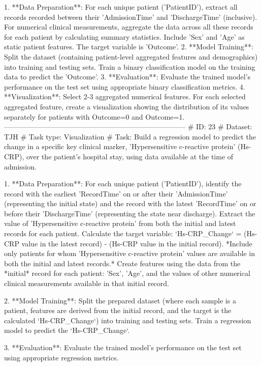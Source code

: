 \begin{tcolorbox}[colback=cadmiumgreen!5!white,colframe=forestgreen!75!white,breakable,title=\textit{Generated analytical tasks in task 4.}]
\begin{VerbatimWrap}
 1. **Data Preparation**: For each unique patient ('PatientID'), extract all records recorded between their 'AdmissionTime' and 'DischargeTime' (inclusive). For numerical clinical measurements, aggregate the data across all these records for each patient by calculating summary statistics. Include 'Sex' and 'Age' as static patient features. The target variable is 'Outcome'.
 2. **Model Training**: Split the dataset (containing patient-level aggregated features and demographics) into training and testing sets. Train a binary classification model on the training data to predict the 'Outcome'.
 3. **Evaluation**: Evaluate the trained model's performance on the test set using appropriate binary classification metrics.
 4. **Visualization**: Select 2-3 aggregated numerical features. For each selected aggregated feature, create a visualization showing the distribution of its values separately for patients with Outcome=0 and Outcome=1.
-----------------------------------------------------------------------------
# ID: 23  
# Dataset: TJH 
# Task type: Visualization
# Task: Build a regression model to predict the change in a specific key clinical marker, 'Hypersensitive c-reactive protein' (Hs-CRP), over the patient's hospital stay, using data available at the time of admission.
 
 1. **Data Preparation**: For each unique patient ('PatientID'), identify the record with the earliest 'RecordTime' on or after their 'AdmissionTime' (representing the initial state) and the record with the latest 'RecordTime' on or before their 'DischargeTime' (representing the state near discharge). Extract the value of 'Hypersensitive c-reactive protein' from both the initial and latest records for each patient. Calculate the target variable: `Hs-CRP_Change` = (Hs-CRP value in the latest record) - (Hs-CRP value in the initial record). *Include only patients for whom 'Hypersensitive c-reactive protein' values are available in both the initial and latest records.*
  Create features using the data from the *initial* record for each patient: 'Sex', 'Age', and the values of other numerical clinical measurements available in that initial record.
 
 2. **Model Training**: Split the prepared dataset (where each sample is a patient, features are derived from the initial record, and the target is the calculated `Hs-CRP_Change`) into training and testing sets. Train a regression model to predict the `Hs-CRP_Change`.
 
 3. **Evaluation**: Evaluate the trained model's performance on the test set using appropriate regression metrics.
 

\end{VerbatimWrap}
\end{tcolorbox}
